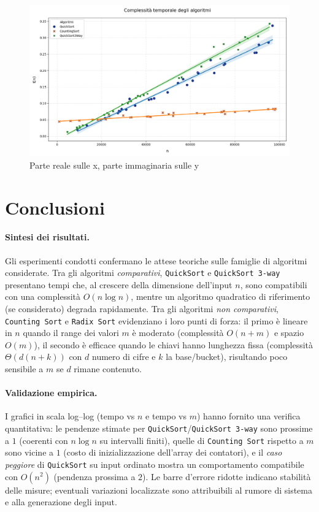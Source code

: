 \documentclass[a4paper, 11pt]{article}
\begin{document}
\begin{figure} [H]
    \centering
    \includegraphics[scale=0.5]{Immagini/Grafico.png}
    \caption*{Parte reale sulle x, parte immaginaria sulle y}
\end{figure}

\section{Conclusioni}

\paragraph{Sintesi dei risultati.}
Gli esperimenti condotti confermano le attese teoriche sulle famiglie di algoritmi considerate. 
Tra gli algoritmi \emph{comparativi}, \texttt{QuickSort} e \texttt{QuickSort 3-way} presentano tempi che, al crescere della dimensione dell'input \(n\), sono compatibili con una complessità \(O(n\log n)\), mentre un algoritmo quadratico di riferimento (se considerato) degrada rapidamente. 
Tra gli algoritmi \emph{non comparativi}, \texttt{Counting Sort} e \texttt{Radix Sort} evidenziano i loro punti di forza: il primo è lineare in \(n\) quando il range dei valori \(m\) è moderato (complessità \(O(n+m)\) e spazio \(O(m)\)), il secondo è efficace quando le chiavi hanno lunghezza fissa (complessità \(\Theta(d(n+k))\) con \(d\) numero di cifre e \(k\) la base/bucket), risultando poco sensibile a \(m\) se \(d\) rimane contenuto.

\paragraph{Validazione empirica.}
I grafici in scala log--log (tempo vs \(n\) e tempo vs \(m\)) hanno fornito una verifica quantitativa: 
le pendenze stimate per \texttt{QuickSort}/\texttt{QuickSort 3-way} sono prossime a \(1\) (coerenti con \(n\log n\) su intervalli finiti), 
quelle di \texttt{Counting Sort} rispetto a \(m\) sono vicine a \(1\) (costo di inizializzazione dell'array dei contatori), 
e il \emph{caso peggiore} di \texttt{QuickSort} su input ordinato mostra un comportamento compatibile con \(O(n^2)\) (pendenza prossima a \(2\)). 
Le barre d'errore ridotte indicano stabilità delle misure; eventuali variazioni localizzate sono attribuibili al rumore di sistema e alla generazione degli input.
\end{document}
